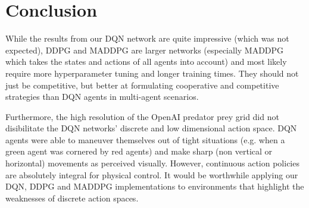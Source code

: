 
\section{Conclusion}
\label{sec:conclusion}

While the results from our DQN network are quite impressive (which was not expected), DDPG and MADDPG are larger networks (especially MADDPG which takes the states and actions of all agents into account) and most likely require more hyperparameter tuning and longer training times. They should not just be competitive, but better at formulating cooperative and competitive strategies than DQN agents in multi-agent scenarios.

Furthermore, the high resolution of the OpenAI predator prey grid did not disibilitate the DQN networks' discrete and low dimensional action space. DQN agents were able to maneuver themselves out of tight situations (e.g. when a green agent was cornered by red agents) and make sharp (non vertical or horizontal) movements as perceived visually. However, continuous action policies are absolutely integral for physical control. It would be worthwhile applying our DQN, DDPG and MADDPG implementations to environments that highlight the weaknesses of discrete action spaces. 

